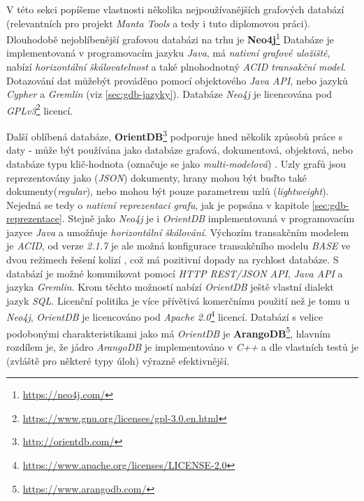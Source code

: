 V této sekci popíšeme vlastnosti několika nejpoužívanějších grafových databází (relevantních pro projekt \textit{Manta Tools} a tedy i tuto diplomovou práci). Dlouhodobě nejoblíbenější grafovou databázi na trhu \cite{Ranking17} je \textbf{Neo4j}\footnote{\url{https://neo4j.com/}} Databáze je implementovaná v programovacím jazyku \textit{Java}, má \textit{nativní grafové uložiště}, nabízí \textit{horizontální škálovatelnost} a také plnohodnotný \textit{ACID transakční model}. Dotazování dat můžebýt prováděno pomocí objektového \textit{Java API}, nebo jazyků \textit{Cypher} a \textit{Gremlin} (viz \ref{sec:gdb-jazyky}). Databáze \textit{Neo4j} je licencována pod \textit{GPLv3}\footnote{\url{https://www.gnu.org/licenses/gpl-3.0.en.html}} licencí.

Další oblíbená databáze, \textbf{OrientDB}\footnote{\url{http://orientdb.com/}} podporuje hned několik způsobů práce s daty - může být používána jako databáze grafová, dokumentová, objektová, nebo databáze typu klič-hodnota (označuje se jako \textit{multi-modelová}) \cite{OrientMultiModel}. Uzly grafů jsou reprezentovány jako (\textit{JSON}) dokumenty, hrany mohou být buďto také dokumenty(\textit{regular}), nebo mohou být pouze parametrem uzlů (\textit{lightweight}). Nejedná se tedy o \textit{nativní reprezentaci grafu}, jak je popsána v kapitole \ref{sec:gdb-reprezentace}.
Stejně jako \textit{Neo4j} je i \textit{OrientDB} implementovaná v programovacím jazyce \textit{Java} a umožňuje \textit{horizontální škálování}. Výchozím transakčním modelem je \textit{ACID}, od verze \textit{2.1.7} je ale možná konfigurace transakčního modelu \textit{BASE} ve dvou režimech řešení kolizí \cite{OrientConsistency}, což má pozitivní dopady na rychlost databáze. S databází je možné komunikovat pomocí \textit{HTTP REST/JSON API}, \textit{Java API} a jazyka \textit{Gremlin}. Krom těchto možností nabízí \textit{OrientDB} ještě vlastní dialekt jazyk \textit{SQL}. Licenční politika je více přívětivá komerčnímu použití než je tomu u \textit{Neo4j}, \textit{OrientDB} je licencováno pod \textit{Apache 2.0}\footnote{\url{https://www.apache.org/licenses/LICENSE-2.0}} licencí.
Databází s velice podobonými charakteristikami jako má \textit{OrientDB} je \textbf{ArangoDB}\footnote{\url{https://www.arangodb.com/}}, hlavním rozdílem je, že jádro \textit{ArangoDB} je implementováno v \textit{C++} a dle vlastních testů \cite{ArangoBenchmark} je (zvláště pro některé typy úloh) výrazně efektivnější.

